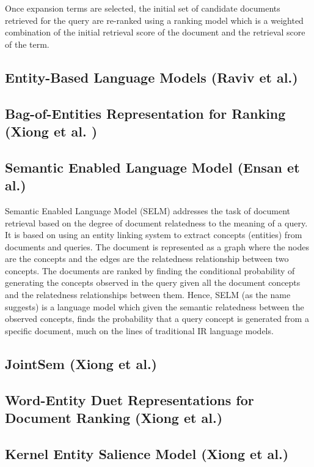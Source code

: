\documentclass{article}
\begin{document}
Once expansion terms are selected, the initial set of candidate documents retrieved for the query are re-ranked using a ranking model which is a weighted combination of the initial retrieval score of the document and the retrieval score of the term. 

\subsection{Entity-Based Language Models (Raviv et al.\cite{raviv2016document})}
\label{subsec:eblm}

\subsection{Bag-of-Entities Representation for Ranking (Xiong et al. \cite{xiong2016bag})}
\label{subsec:bag of entities}

\subsection{Semantic Enabled Language Model (Ensan et al.\cite{ensan2017document})}
\label{subsec:selm}

Semantic Enabled Language Model (SELM) addresses the task of document retrieval based on the degree of document relatedness to the meaning of a query. It is based on using an entity linking system to extract concepts (entities) from documents and queries. The document is represented as a graph where the nodes are the concepts and the edges are the relatedness relationship between two concepts. The documents are ranked by finding the conditional probability of generating the concepts observed in the query given all the document concepts and the relatedness relationships between them. Hence, SELM (as the name suggests) is a language model which given the semantic relatedness between the observed concepts, finds the probability that a query concept is generated from a specific document, much on the lines of traditional IR language models.

\subsection{JointSem (Xiong et al.\cite{xiong2017jointsem})}
\label{subsec:jointsem}

\subsection{Word-Entity Duet Representations for Document Ranking (Xiong et al.\cite{xiong2017word})}
\label{subsec:word entity duet}

\subsection{Kernel Entity Salience Model (Xiong et al.\cite{xiong2018towards})}
\label{subsec:kesm}








\end{document}
